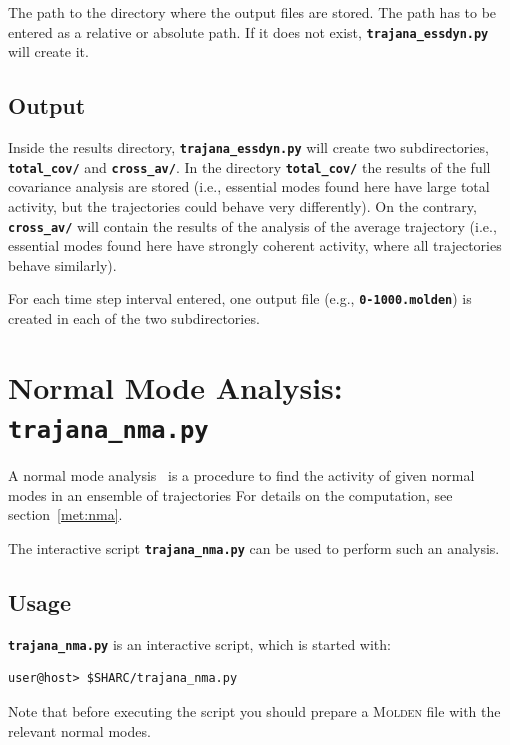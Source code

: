 \documentclass[a4paper,10pt,DIV=15,openany]{scrbook}
\newcommand{\ttt}[1]{\textbf{\texttt{#1}}}
\begin{document}
The path to the directory where the output files are stored.
The path has to be entered as a relative or absolute path.
If it does not exist, \ttt{trajana\_essdyn.py} will create it.

\subsection{Output}

Inside the results directory, \ttt{trajana\_essdyn.py} will create two subdirectories, \ttt{total\_cov/} and \ttt{cross\_av/}.
In the directory \ttt{total\_cov/} the results of the full covariance analysis are stored (i.e., essential modes found here have large total activity, but the trajectories could behave very differently).
On the contrary, \ttt{cross\_av/} will contain the results of the analysis of the average trajectory (i.e., essential modes found here have strongly coherent activity, where all trajectories behave similarly).

For each time step interval entered, one output file (e.g., \ttt{0-1000.molden}) is created in each of the two subdirectories.





\section{Normal Mode Analysis: \ttt{trajana\_nma.py}}\label{sec:trajana_nma.py}

A normal mode analysis~\cite{Kurtz2001JCP} is a procedure to find the activity of given normal modes in an ensemble of trajectories
For details on the computation, see section~\ref{met:nma}.

The interactive script \ttt{trajana\_nma.py} can be used to perform such an analysis.

\subsection{Usage}

\ttt{trajana\_nma.py} is an interactive script, which is started with:
\begin{verbatim}
user@host> $SHARC/trajana_nma.py
\end{verbatim}
Note that before executing the script you should prepare a \textsc{Molden} file with the relevant normal modes.
\end{document}
